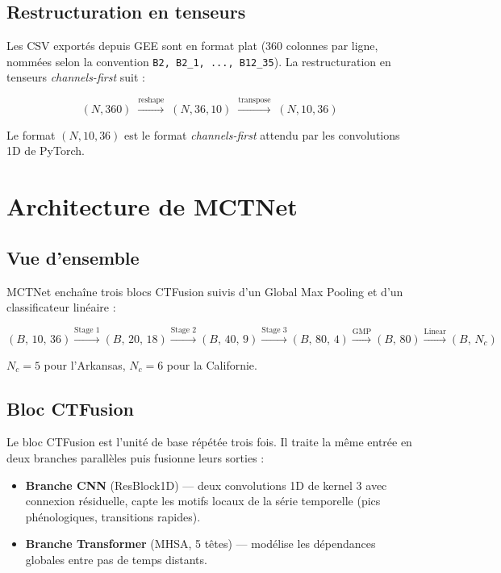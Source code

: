 \subsection{Restructuration en tenseurs}

Les CSV exportés depuis GEE sont en format plat (360 colonnes par ligne,
nommées selon la convention \texttt{B2, B2\_1, ..., B12\_35}). La
restructuration en tenseurs \textit{channels-first} suit :

\begin{equation}
  (N, 360) \;\xrightarrow{\text{reshape}}\; (N, 36, 10)
            \;\xrightarrow{\text{transpose}}\; (N, 10, 36)
\end{equation}

Le format $(N, 10, 36)$ est le format \textit{channels-first} attendu par
les convolutions 1D de PyTorch.

\section{Architecture de MCTNet}
\label{sec:architecture}

\subsection{Vue d'ensemble}

MCTNet enchaîne trois blocs CTFusion suivis d'un Global Max Pooling et d'un
classificateur linéaire :

\begin{equation}
  (B,\,10,\,36)
  \xrightarrow{\text{Stage 1}} (B,\,20,\,18)
  \xrightarrow{\text{Stage 2}} (B,\,40,\,9)
  \xrightarrow{\text{Stage 3}} (B,\,80,\,4)
  \xrightarrow{\text{GMP}} (B,\,80)
  \xrightarrow{\text{Linear}} (B,\,N_c)
\end{equation}

$N_c = 5$ pour l'Arkansas, $N_c = 6$ pour la Californie.

\subsection{Bloc CTFusion}

Le bloc CTFusion est l'unité de base répétée trois fois. Il traite la même
entrée en deux branches parallèles puis fusionne leurs sorties :

\begin{itemize}
  \item \textbf{Branche CNN} (ResBlock1D) — deux convolutions 1D de kernel 3
        avec connexion résiduelle, capte les motifs locaux de la série
        temporelle (pics phénologiques, transitions rapides).
  \item \textbf{Branche Transformer} (MHSA, 5 têtes) — modélise les
        dépendances globales entre pas de temps distants.
\end{itemize}

